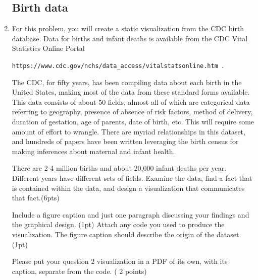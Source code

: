 \documentclass[]{book}
\theoremstyle{definition}
\newtheorem*{soln}{Solution}
\begin{document}
\begin{enumerate}
\subsection*{Birth data }
\item\label{births}

For this problem, you will create a static visualization from the CDC birth database.  Data for births and infant deaths is available from the CDC Vital Statistics Online Portal 

\texttt{https://www.cdc.gov/nchs/data\_access/vitalstatsonline.htm }.

The CDC, for fifty years, has been compiling data about each birth in the United States, making most of the data from these standard forms available. This data consists of about 50 fields, almost all of which are categorical data referring to geography, presence of absence of risk factors, method of delivery, duration of gestation, age of parents, date of birth, etc. This will require some amount of effort to wrangle.  There are myriad relationships in this dataset, and hundreds of papers have been written leveraging the birth census for making inferences about maternal and infant health.

There are 2-4 million births and about 20,000 infant deaths per year.  Different years have different sets of fields. Examine the data, find a fact that is contained within the data, and design a visualization that communicates that fact.(6pts)

Include a figure caption and just one paragraph discussing your findings and the graphical design. (1pt) Attach any code you used to produce the visualization. The figure caption should describe the origin of the dataset.(1pt)


Please put your question 2 visualization in a PDF of its own, with its caption, separate from the code.  ( 2 points)


\end{enumerate}
\end{document}

